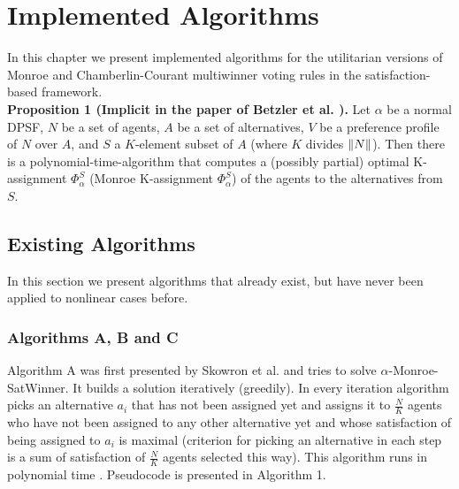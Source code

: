 \chapter{Implemented Algorithms}
\label{cha:implementedAlgorithms}

In this chapter we present implemented algorithms for the utilitarian versions of Monroe and Chamberlin-Courant multiwinner voting rules in the satisfaction-based framework.
\\

\noindent
\textbf{Proposition 1 (Implicit in the paper of Betzler et al. \cite{3}).} Let $\alpha$ be a normal DPSF, $N$ be a set of agents, $A$ be a set of alternatives, $V$ be a preference profile of $N$ over $A$, and $S$ a $K$-element subset of $A$ (where $K$ divides $\lVert N\rVert$). Then there is a polynomial-time-algorithm that computes a (possibly partial) optimal K-assignment $\Phi^{S}_{\alpha}$ (Monroe K-assignment $\Phi^{S}_{\alpha}$) of the agents to the alternatives from $S$.
\\

\section{Existing Algorithms}

In this section we present algorithms that already exist, but have never been applied to nonlinear cases before.

\subsection{Algorithms A, B and C}

Algorithm A was first presented by Skowron et al. \cite{1} and tries to solve $\alpha$-Monroe-SatWinner. It builds a solution iteratively (greedily). In every iteration algorithm picks an alternative $a_{i}$ that has not been assigned yet and assigns it to $\frac{N}{K}$ agents who have not been assigned to any other alternative yet and whose satisfaction of being assigned to $a_{i}$ is maximal (criterion for picking an alternative in each step is a sum of satisfaction of $\frac{N}{K}$ agents selected this way). This algorithm runs in polynomial time \cite{1}. Pseudocode is presented in Algorithm 1.
\\

